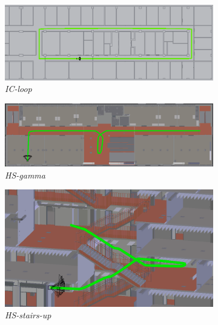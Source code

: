 \begin{figure}[H]
	\centering
	\begin{subfigure}[t]{1.0\linewidth}
		\centering
		\includegraphics[width=\linewidth]{images/trajectories/traj-ic.png}
		\caption{\textit{IC-loop}}
		\label{subfig:traj_ic}
	\end{subfigure}
	\hfill \medskip
	\begin{subfigure}[t]{1.0\linewidth}
		\centering
		\includegraphics[width=\linewidth]{images/trajectories/traj-hs-gamma.png}
		\caption{\textit{HS-gamma}}
		\label{subfig:traj_hs_gamma}
	\end{subfigure}
	\hfill \medskip
	\begin{subfigure}[tr]{0.45\linewidth}
		\flushleft
		\includegraphics[width=\linewidth]{images/trajectories/traj-stairs-up.png}
		\caption{\textit{HS-stairs-up}}
		\label{subfig:traj_hs-up}
	\end{subfigure}
	\hfill
	\begin{subfigure}[tl]{0.45\linewidth}

\end{subfigure}
\end{figure}

